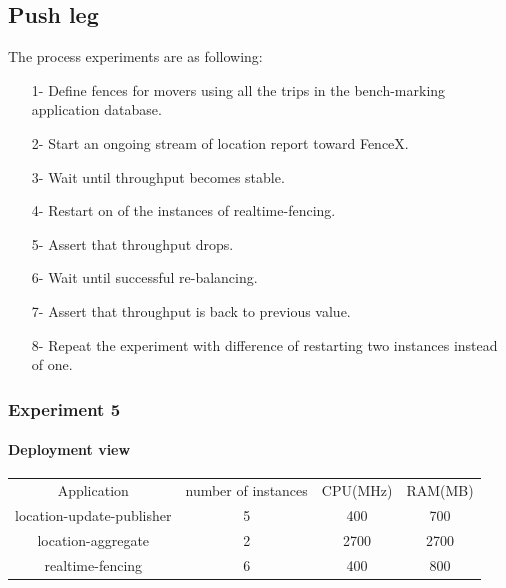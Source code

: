\documentclass[a4]{report}
\begin{document}
    \subsection{Push leg}
    The process experiments are as following:
    \begin{itemize}
        \item[1-] Define fences for movers using all the trips in the bench-marking application database.
        \item[2-] Start an ongoing stream of location report toward FenceX.
        \item[3-] Wait until throughput becomes stable.
        \item[4-] Restart on of the instances of realtime-fencing.
        \item[5-] Assert that throughput drops.
        \item[6-] Wait until successful re-balancing.
        \item[7-] Assert that throughput is back to previous value.
        \item[8-] Repeat the experiment with difference of restarting two instances instead of one.
    \end{itemize}

    \subsubsection{Experiment 5}

    \paragraph{Deployment view}
    \begin{center}
        \begin{tabular}{ c c c c }
            Application               & number of instances & CPU(MHz) & RAM(MB) \\
            location-update-publisher & 5                   & 400      & 700     \\
            location-aggregate        & 2                   & 2700     & 2700    \\
            realtime-fencing          & 6                   & 400      & 800     \\
        \end{tabular}
    \end{center}
\end{document}

